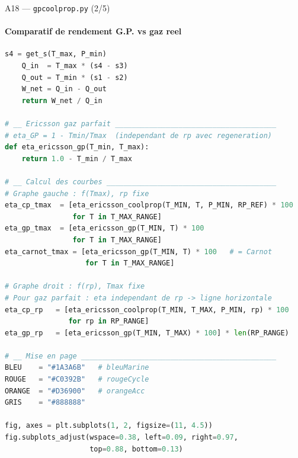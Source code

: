 \documentclass[aspectratio=43, 10pt]{beamer}
\begin{document}
\begin{frame}[fragile]{A18 --- \texttt{gpcoolprop.py} (2/5)}
  \framesubtitle{Comparatif de rendement G.P. vs gaz reel}
  \begin{exampleblock}{}
  \begin{lstlisting}[language=Python, basicstyle=\tiny\ttfamily]
    s4 = get_s(T_max, P_min)
    Q_in  = T_max * (s4 - s3)
    Q_out = T_min * (s1 - s2)
    W_net = Q_in - Q_out
    return W_net / Q_in

# __ Ericsson gaz parfait ______________________________________
# eta_GP = 1 - Tmin/Tmax  (independant de rp avec regeneration)
def eta_ericsson_gp(T_min, T_max):
    return 1.0 - T_min / T_max

# __ Calcul des courbes ________________________________________
# Graphe gauche : f(Tmax), rp fixe
eta_cp_tmax  = [eta_ericsson_coolprop(T_MIN, T, P_MIN, RP_REF) * 100
                for T in T_MAX_RANGE]
eta_gp_tmax  = [eta_ericsson_gp(T_MIN, T) * 100
                for T in T_MAX_RANGE]
eta_carnot_tmax = [eta_ericsson_gp(T_MIN, T) * 100   # = Carnot
                   for T in T_MAX_RANGE]

# Graphe droit : f(rp), Tmax fixe
# Pour gaz parfait : eta independant de rp -> ligne horizontale
eta_cp_rp   = [eta_ericsson_coolprop(T_MIN, T_MAX, P_MIN, rp) * 100
               for rp in RP_RANGE]
eta_gp_rp   = [eta_ericsson_gp(T_MIN, T_MAX) * 100] * len(RP_RANGE)

# __ Mise en page ______________________________________________
BLEU    = "#1A3A6B"   # bleuMarine
ROUGE   = "#C0392B"   # rougeCycle
ORANGE  = "#D36900"   # orangeAcc
GRIS    = "#888888"

fig, axes = plt.subplots(1, 2, figsize=(11, 4.5))
fig.subplots_adjust(wspace=0.38, left=0.09, right=0.97,
                    top=0.88, bottom=0.13)
  \end{lstlisting}
  \end{exampleblock}
\end{frame}
\end{document}
